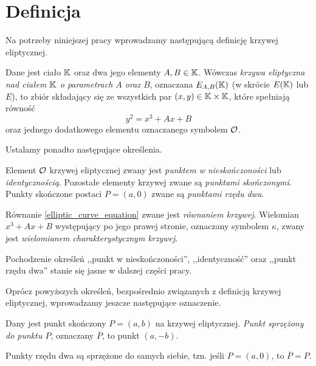 \section{Definicja}

Na potrzeby niniejszej pracy wprowadzamy
następującą definicję krzywej eliptycznej.

\begin{definition}\label{elliptic_curve_definition}
Dane jest ciało $\mathbb{K}$ oraz dwa jego elementy $A, B \in \mathbb{K}$.
Wówczas \emph{krzywa eliptyczna nad ciałem $\mathbb{K}$ o parametrach $A$ oraz $B$},
oznaczana $E_{A,B}(\mathbb{K})$ (w skrócie $E(\mathbb{K})$ lub $E$),
to zbiór składający się
ze wszystkich par $(x, y) \in \mathbb{K} \times \mathbb{K}$, które spełniają równość
\begin{equation}\label{elliptic_curve_equation}
y^2 = x^3 + Ax + B
\end{equation}
oraz jednego dodatkowego elementu oznaczanego symbolem $\mathcal{O}$.
\end{definition}

Ustalamy ponadto następujące określenia.

\begin{definition}
Element $\mathcal{O}$ krzywej eliptycznej zwany jest
\emph{punktem w nieskończoności} lub \emph{identycznością}.
Pozostałe elementy krzywej zwane są \emph{punktami skończonymi}.
Punkty skończone postaci $P = (a, 0)$ zwane są \emph{punktami rzędu dwa}.
\end{definition}

\begin{definition}
Równanie \ref{elliptic_curve_equation} zwane jest \emph{równaniem krzywej}.
Wielomian $x^3 + Ax + B$ występujący po jego prawej stronie,
oznaczany symbolem $\kappa$,
zwany jest \emph{wielomianem charakterystycznym krzywej}.
\end{definition}

Pochodzenie określeń
,,punkt w nieskończoności'', ,,identyczność'' oraz ,,punkt rzędu dwa''
stanie się jasne w dalszej części pracy.

Oprócz powyższych określeń,
bezpośrednio związanych z definicją krzywej eliptycznej,
wprowadzamy jeszcze następujące oznaczenie.

\begin{definition}
Dany jest punkt skończony $P = (a, b)$ na krzywej eliptycznej.
\emph{Punkt sprzężony do punktu $P$}, oznaczany $\overline{P}$,
to punkt $(a, -b)$.
\end{definition}

\begin{fact}
Punkty rzędu dwa są sprzężone do samych siebie,
tzn. jeśli $P = (a, 0)$, to $\overline{P} = P$.
\end{fact}

